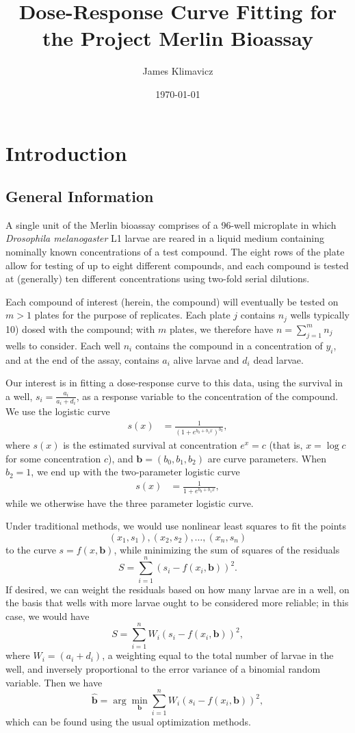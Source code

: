 \documentclass[11pt, letterpaper]{article}
\begin{document}
\title{Dose-Response Curve Fitting for the Project Merlin Bioassay}
\date{\today}
\author{James Klimavicz}
\maketitle

\section{Introduction}
\subsection{General Information}
A single unit of the Merlin bioassay comprises of a 96-well microplate in which \textit{Drosophila melanogaster} L1 larvae are reared in a liquid medium containing nominally known concentrations of a test compound. The eight rows of the plate allow for testing of up to eight different compounds, and each compound is tested at (generally) ten different concentrations using two-fold serial dilutions.

Each compound of interest (herein, the compound) will eventually be tested on $m>1$ plates for the purpose of replicates. Each plate $j$ contains $n_j$ wells typically 10) dosed with the compound; with $m$ plates, we therefore have $n = \sum_{j=1}^m n_j$ wells to consider. Each well $n_i$ contains the compound in a concentration of $y_i$, and at the end of the assay, contains $a_i$ alive larvae and $d_i$ dead larvae. 

Our interest is in fitting a dose-response curve to this data, using the survival in a well, $s_i = \frac{a_i}{a_i+d_i}$, as a response variable to the concentration of the compound. We use the logistic curve 
\begin{align*}
s(x) &= \frac{1}{\left(1+e^{b_0 + b_1x}\right)^{b_2}},
\end{align*}
where $s(x)$ is the estimated survival at concentration $e^x = c$ (that is, $x = \log c$ for some concentration $c$), and $\bm b = (b_0, b_1, b_2)$ are curve parameters. When $b_2 =1$, we end up with the two-parameter logistic curve 
\begin{align*}
s(x) &= \frac{1}{1+e^{b_0 + b_1x}},
\end{align*}
while we otherwise have the three parameter logistic curve.

Under traditional methods, we would use nonlinear least squares to fit the points $$(x_1, s_1), (x_2, s_2), \dots, (x_n, s_n)$$ to the curve $s = f(x, \bm b)$, while minimizing the sum of squares of the residuals $$S = \sum_{i=1}^n \left(s_i - f(x_i, \bm b) \right)^2.$$ If desired, we can weight the residuals based on how many larvae are in a well, on the basis that wells with more larvae ought to be considered more reliable; in this case, we would have $$S = \sum_{i=1}^n W_i\left(s_i - f(x_i, \bm b) \right)^2,$$
where $W_i = (a_i+d_i)$, a weighting equal to the total number of larvae in the well, and inversely proportional to the error variance of a binomial random variable. Then we have $$ \hat{\bm b} = \arg \min_{\bm b} \sum_{i=1}^n W_i\left(s_i - f(x_i, \bm b) \right)^2,$$ which can be found using the usual optimization methods. 
\end{document}
